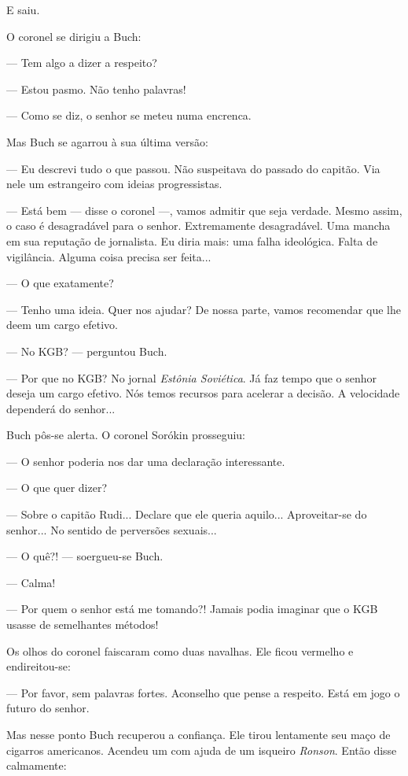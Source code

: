 E saiu.

O coronel se dirigiu a Buch:

--- Tem algo a dizer a respeito?

--- Estou pasmo. Não tenho palavras!

--- Como se diz, o senhor se meteu numa encrenca.

Mas Buch se agarrou à sua última versão:

--- Eu descrevi tudo o que passou. Não suspeitava do passado do capitão.
Via nele um estrangeiro com ideias progressistas.

--- Está bem --- disse o coronel ---, vamos admitir que seja verdade.
Mesmo assim, o caso é desagradável para o senhor. Extremamente
desagradável. Uma mancha em sua reputação de jornalista. Eu diria mais:
uma falha ideológica. Falta de vigilância. Alguma coisa precisa ser
feita...

--- O que exatamente?

--- Tenho uma ideia. Quer nos ajudar? De nossa parte, vamos recomendar
que lhe deem um cargo efetivo.

--- No KGB? --- perguntou Buch.

--- Por que no KGB? No jornal \emph{Estônia Soviética}. Já faz tempo que
o senhor deseja um cargo efetivo. Nós temos recursos para acelerar a
decisão. A velocidade dependerá do senhor...

Buch pôs-se alerta. O coronel Sorókin prosseguiu:

--- O senhor poderia nos dar uma declaração interessante.

--- O que quer dizer?

--- Sobre o capitão Rudi... Declare que ele queria aquilo...
Aproveitar-se do senhor... No sentido de perversões sexuais...

--- O quê?! --- soergueu-se Buch.

--- Calma!

--- Por quem o senhor está me tomando?! Jamais podia imaginar que o KGB
usasse de semelhantes métodos!

Os olhos do coronel faiscaram como duas navalhas. Ele ficou vermelho e
endireitou-se:

--- Por favor, sem palavras fortes. Aconselho que pense a respeito. Está
em jogo o futuro do senhor.

Mas nesse ponto Buch recuperou a confiança. Ele tirou lentamente seu
maço de cigarros americanos. Acendeu um com ajuda de um isqueiro
\emph{Ronson}. Então disse calmamente:

